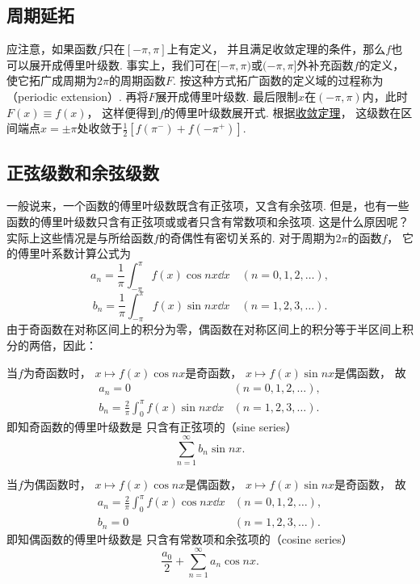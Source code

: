 \subsection{周期延拓}
应注意，如果函数\(f\)只在\([-\pi,\pi]\)上有定义，
并且满足收敛定理的条件，那么\(f\)也可以展开成傅里叶级数.
事实上，我们可在\([-\pi,\pi)\)或\((-\pi,\pi]\)外补充函数\(f\)的定义，
使它拓广成周期为\(2\pi\)的周期函数\(F\).
按这种方式拓广函数的定义域的过程称为（periodic extension）.
再将\(F\)展开成傅里叶级数.
最后限制\(x\)在\((-\pi,\pi)\)内，此时\(F(x) \equiv f(x)\)，
这样便得到\(f\)的傅里叶级数展开式.
根据\hyperref[theorem:无穷级数.傅里叶级数收敛的狄利克雷充分条件]{收敛定理}，
这级数在区间端点\(x=\pm\pi\)处收敛于\(\frac{1}{2} [f(\pi^-) + f(-\pi^+)]\).

\subsection{正弦级数和余弦级数}
一般说来，一个函数的傅里叶级数既含有正弦项，又含有余弦项.
但是，也有一些函数的傅里叶级数只含有正弦项或或者只含有常数项和余弦项.
这是什么原因呢？实际上这些情况是与所给函数\(f\)的奇偶性有密切关系的.
对于周期为\(2\pi\)的函数\(f\)，
它的傅里叶系数计算公式为\[
	a_n = \frac{1}{\pi} \int_{-\pi}^\pi f(x) \cos nx \dd{x} \quad(n=0,1,2,\dotsc),
\]\[
	b_n = \frac{1}{\pi} \int_{-\pi}^\pi f(x) \sin nx \dd{x} \quad(n=1,2,3,\dotsc).
\]
由于奇函数在对称区间上的积分为零，偶函数在对称区间上的积分等于半区间上积分的两倍，因此：

当\(f\)为奇函数时，
\(x \mapsto f(x) \cos nx\)是奇函数，
\(x \mapsto f(x) \sin nx\)是偶函数，
故\[
	\begin{array}{ll}
		a_n = 0 & (n=0,1,2,\dotsc), \\
		b_n = \frac{2}{\pi} \int_0^\pi f(x) \sin nx \dd{x} & (n=1,2,3,\dotsc).
	\end{array}
\]
即知奇函数的傅里叶级数是
只含有正弦项的（sine series）\[
	\sum_{n=1}^\infty b_n \sin nx.
\]

当\(f\)为偶函数时，
\(x \mapsto f(x) \cos nx\)是偶函数，
\(x \mapsto f(x) \sin nx\)是奇函数，
故\[
	\begin{array}{ll}
		a_n = \frac{2}{\pi} \int_0^\pi f(x) \cos nx \dd{x} & (n=0,1,2,\dotsc), \\
		b_n = 0 & (n=1,2,3,\dotsc).
	\end{array}
\]
即知偶函数的傅里叶级数是
只含有常数项和余弦项的（cosine series）\[
	\frac{a_0}{2} + \sum_{n=1}^\infty a_n \cos{nx}.
\]

